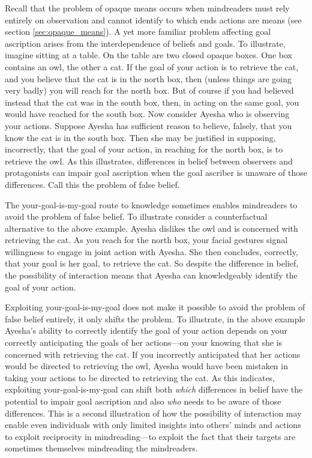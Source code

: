 \documentclass[12pt,a4paper]{extarticle}
\begin{document}
Recall that the problem of opaque means occurs when mindreaders  must rely entirely on observation and cannot identify to which ends actions are means 
(see section \vref{sec:opaque_means}).
A yet more familiar problem affecting goal ascription 
arises from the interdependence of beliefs and goals.
To illustrate, 
imagine sitting at a table.
On the table are two closed opaque boxes.
One box contains an owl, the other a cat.
If the goal of your action is to retrieve the cat, 
and you believe that the cat is in the north box,
then 
(unless things are going very badly) 
you will reach for the north box.
But of course if you had believed instead that the cat was in the south box,
then, in acting on the same goal, you would have reached for the south box.
Now consider Ayesha who is observing your actions.
Suppose Ayesha has sufficient reason to believe, falsely, that you know the cat is in the south box.
Then she may be justified in supposing, incorrectly, that 
the goal of your action, in reaching for the north box,
is to retrieve the owl.
As this illustrates,
differences in belief between observers and protagonists can 
impair goal ascription
when the goal ascriber is unaware of those differences.
Call this the problem of false belief.

The your-goal-is-my-goal
route to knowledge
sometimes enables mindreaders to avoid the problem of false belief.
To illustrate consider a counterfactual alternative to the above example.
Ayesha dislikes the owl and is concerned with retrieving the cat.
As you reach for the north box,
your facial gestures signal willingness to engage in joint action with Ayesha.
She then concludes, correctly, that your goal is her goal, to retrieve the cat.
So despite the difference in belief,
the possibility of interaction means that
Ayesha can knowledgeably identify the goal of your action.

Exploiting your-goal-is-my-goal does not make it possible to  avoid the problem of false belief entirely,
it only shifts  the problem.
To illustrate,
in the above example Ayesha's ability to correctly identify the goal of your action
depends on your correctly anticipating the goals of her actions---on your knowing that she is concerned with retrieving the cat.
If you incorrectly anticipated that her actions would be directed to retrieving the owl,
Ayesha would have been mistaken in taking your actions to be directed to retrieving the cat.
As this indicates,
exploiting your-goal-is-my-goal 
can shift 
both 
\emph{which} differences in belief have the potential to impair  goal ascription
and also 
\emph{who} needs to be aware of those differences.
This is a second illustration of how the possibility of interaction 
may enable 
	even individuals with only limited insights into others' minds and actions
 	to exploit reciprocity in mindreading---to exploit the fact that their targets are sometimes themselves mindreading the mindreaders.
\end{document}
